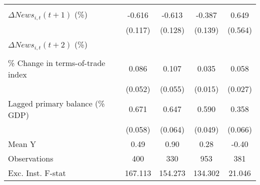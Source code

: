 {\begin{tabular}{l*{4}{c}}
                    &                     &                     &                     &                     \\
\addlinespace
$ \Delta News_{i,t}(t+1)$ (\%)&      -0.616\sym{***}&      -0.613\sym{***}&      -0.387\sym{***}&       0.649         \\
                    &     (0.117)         &     (0.128)         &     (0.139)         &     (0.564)         \\
\addlinespace
$ \Delta News_{i,t}(t+2)$ (\%)&                     &                     &                     &                     \\
                    &                     &                     &                     &                     \\
\addlinespace
\% Change in terms-of-trade index&       0.086\sym{*}  &       0.107\sym{*}  &       0.035\sym{**} &       0.058\sym{**} \\
                    &     (0.052)         &     (0.055)         &     (0.015)         &     (0.027)         \\
\addlinespace
Lagged primary balance (\% GDP)&       0.671\sym{***}&       0.647\sym{***}&       0.590\sym{***}&       0.358\sym{***}\\
                    &     (0.058)         &     (0.064)         &     (0.049)         &     (0.066)         \\
\midrule
Mean Y              &        0.49         &        0.90         &        0.28         &       -0.40         \\
Observations        &         400         &         330         &         953         &         381         \\
Exc. Inst. F-stat   &     167.113         &     154.273         &     134.302         &      21.046         \\
\bottomrule
\end{tabular}
}
